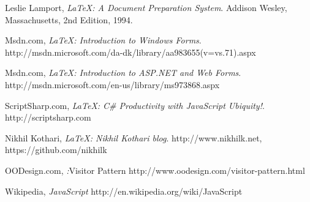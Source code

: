 \begin{thebibliography}{9}
  Leslie Lamport,
  \emph{\LaTeX: A Document Preparation System}.
  Addison Wesley, Massachusetts,
  2nd Edition,
  1994.


  Msdn.com,
  \emph{\LaTeX: Introduction to Windows Forms}.
  http://msdn.microsoft.com/da-dk/library/aa983655(v=vs.71).aspx

  Msdn.com,
  \emph{\LaTeX: Introduction to ASP.NET and Web Forms}.
  http://msdn.microsoft.com/en-us/library/ms973868.aspx

  ScriptSharp.com,
  \emph{\LaTeX: C\# Productivity with JavaScript Ubiquity!}.
  http://scriptsharp.com

  Nikhil Kothari,
  \emph{\LaTeX: Nikhil Kothari blog}.
  http://www.nikhilk.net, https://github.com/nikhilk
  
  OODesign.com,
  \emph:{Visitor Pattern}
  http://www.oodesign.com/visitor-pattern.html

  Wikipedia,
  \emph{JavaScript}
  http://en.wikipedia.org/wiki/JavaScript
\end{thebibliography}










